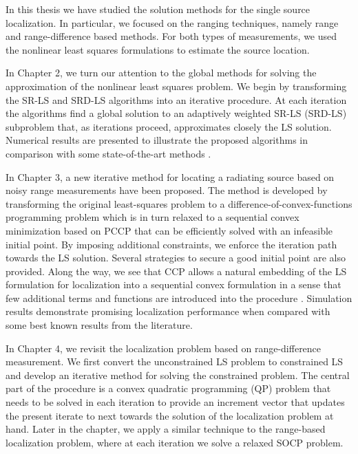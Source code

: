 
In this thesis we have studied the solution methods for the single source localization. In particular, we focused on the ranging techniques, namely range and range-difference based methods. For both types of measurements, we used the nonlinear least squares formulations to estimate the source location. 

In Chapter 2, we turn our attention to the global methods for solving the approximation of the nonlinear least squares problem. We begin by
transforming the SR-LS and SRD-LS algorithms \cite{BeckStLi} into an
iterative procedure. At each iteration the algorithms find a global solution to an  adaptively weighted SR-LS (SRD-LS) subproblem that, as iterations proceed, approximates closely the LS solution.  Numerical results are presented to illustrate the proposed algorithms in comparison with some state-of-the-art methods \cite{IRWSg}.


In Chapter 3,  a new iterative method for locating a radiating source based on noisy range measurements have been proposed. The method is developed by transforming the original least-squares problem to a difference-of-convex-functions programming problem which is in turn relaxed to a sequential convex minimization based on PCCP that can be efficiently solved with an infeasible initial point. By imposing additional constraints, we  enforce the iteration path towards the LS solution. Several strategies to secure a good initial point are also provided.  Along the way, we see that CCP allows a natural embedding of the LS formulation for localization into a sequential convex formulation in a sense that few additional terms and functions are introduced into the procedure \cite{PCCP}. Simulation results demonstrate promising localization performance when compared with some best known results from the literature.

In Chapter 4, we revisit the localization problem based on range-difference measurement. We first convert the unconstrained LS problem to constrained LS and develop an iterative method for solving the constrained problem.  The central part of the procedure is a convex quadratic programming (QP) problem that needs to be solved in each iteration to provide an increment vector that updates the present iterate to next towards the solution of the localization problem at hand. Later in the chapter, we apply a similar technique to the range-based localization problem, where at each iteration we solve a relaxed SOCP problem.


